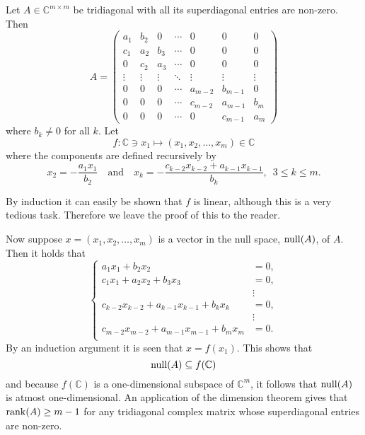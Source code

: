 \documentclass[a4paper,12pt]{article}
\begin{document}
Let \(A \in \mathbb{C}^{m \times m}\) be tridiagonal with all its superdiagonal
entries are non-zero.
Then
\[
  A =
    \begin{pmatrix}
      a_1    & b_2    & 0      & \cdots & 0       & 0       & 0      \\
      c_1    & a_2    & b_3    & \cdots & 0       & 0       & 0      \\
      0      & c_2    & a_3    & \cdots & 0       & 0       & 0      \\
      \vdots & \vdots & \vdots & \ddots & \vdots  & \vdots  & \vdots \\
      0      & 0      & 0      & \cdots & a_{m-2} & b_{m-1} & 0      \\
      0      & 0      & 0      & \cdots & c_{m-2} & a_{m-1} & b_m    \\
      0      & 0      & 0      & \cdots & 0       & c_{m-1} & a_m
    \end{pmatrix}
\]
where \(b_k \ne 0\) for all \(k\).
Let
\[ f: \mathbb{C} \ni x_1 \mapsto (x_1,x_2,\dots,x_m) \in \mathbb{C} \]
where the components are defined recursively by
\[
  x_2 = - \frac{a_1 x_1}{b_2}
  \quad \text{and} \quad
  x_k = - \frac{c_{k-2}x_{k-2} + a_{k-1}x_{k-1}}{b_k}, \enspace 3 \le k \le m.
\]

By induction it can easily be shown that \(f\) is linear, although this is a
very tedious task.
Therefore we leave the proof of this to the reader.

Now suppose \(x = (x_1, x_2, \dots, x_m)\) is a vector in the null space,
\(\mathrm{null}(A)\), of \(A\).
Then it holds that
\[
  \begin{cases}
                      a_1 x_1         + b_2 x_2 &= 0, \\
    c_1 x_1         + a_2 x_2         + b_3 x_3 &= 0, \\
                                                &\vdots \\
    c_{k-2} x_{k-2} + a_{k-1} x_{k-1} + b_k x_k &= 0, \\
                                                &\vdots \\
    c_{m-2} x_{m-2} + a_{m-1} x_{m-1} + b_m x_m &= 0. \\
  \end{cases}
\]
By an induction argument it is seen that \(x = f(x_1)\).
This shows that
\[ \mathrm{null}(A) \subseteq f(\mathbb{C}) \]
and because \(f(\mathbb{C})\) is a one-dimensional subspace of \(\mathbb{C}^m\),
it follows that \(\mathrm{null}(A)\) is atmost one-dimensional.
An application of the dimension theorem gives that \(\mathrm{rank}(A) \ge m - 1\) for
any tridiagonal complex matrix whose superdiagonal entries are non-zero.
\end{document}
